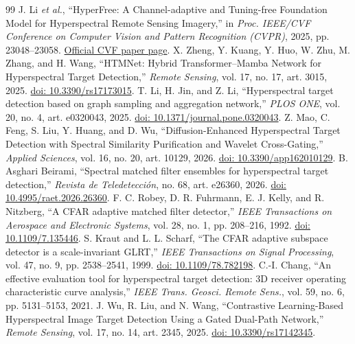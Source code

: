 \documentclass[a4paper,11pt]{article}
\begin{document}
\begin{thebibliography}{99}
 J. Li \emph{et al.}, ``HyperFree: A Channel-adaptive and Tuning-free Foundation Model for Hyperspectral Remote Sensing Imagery,'' in \emph{Proc. IEEE/CVF Conference on Computer Vision and Pattern Recognition (CVPR)}, 2025, pp. 23048--23058. \href{https://openaccess.thecvf.com/content/CVPR2025/html/Li_HyperFree_A_Channel-adaptive_and_Tuning-free_Foundation_Model_for_Hyperspectral_Remote_CVPR_2025_paper.html}{Official CVF paper page}.
 X. Zheng, Y. Kuang, Y. Huo, W. Zhu, M. Zhang, and H. Wang, ``HTMNet: Hybrid Transformer--Mamba Network for Hyperspectral Target Detection,'' \emph{Remote Sensing}, vol. 17, no. 17, art. 3015, 2025. \href{https://doi.org/10.3390/rs17173015}{doi: 10.3390/rs17173015}.
 T. Li, H. Jin, and Z. Li, ``Hyperspectral target detection based on graph sampling and aggregation network,'' \emph{PLOS ONE}, vol. 20, no. 4, art. e0320043, 2025. \href{https://doi.org/10.1371/journal.pone.0320043}{doi: 10.1371/journal.pone.0320043}.
 Z. Mao, C. Feng, S. Liu, Y. Huang, and D. Wu, ``Diffusion-Enhanced Hyperspectral Target Detection with Spectral Similarity Purification and Wavelet Cross-Gating,'' \emph{Applied Sciences}, vol. 16, no. 20, art. 10129, 2026. \href{https://doi.org/10.3390/app162010129}{doi: 10.3390/app162010129}.
 B. Asghari Beirami, ``Spectral matched filter ensembles for hyperspectral target detection,'' \emph{Revista de Teledetecci\'on}, no. 68, art. e26360, 2026. \href{https://doi.org/10.4995/raet.2026.26360}{doi: 10.4995/raet.2026.26360}.
 F. C. Robey, D. R. Fuhrmann, E. J. Kelly, and R. Nitzberg, ``A CFAR adaptive matched filter detector,'' \emph{IEEE Transactions on Aerospace and Electronic Systems}, vol. 28, no. 1, pp. 208--216, 1992. \href{https://doi.org/10.1109/7.135446}{doi: 10.1109/7.135446}.
 S. Kraut and L. L. Scharf, ``The CFAR adaptive subspace detector is a scale-invariant GLRT,'' \emph{IEEE Transactions on Signal Processing}, vol. 47, no. 9, pp. 2538--2541, 1999. \href{https://doi.org/10.1109/78.782198}{doi: 10.1109/78.782198}.
 C.-I. Chang, ``An effective evaluation tool for hyperspectral target detection: 3D receiver operating characteristic curve analysis,'' \emph{IEEE Trans. Geosci. Remote Sens.}, vol. 59, no. 6, pp. 5131--5153, 2021.
 J. Wu, R. Liu, and N. Wang, ``Contrastive Learning-Based Hyperspectral Image Target Detection Using a Gated Dual-Path Network,'' \emph{Remote Sensing}, vol. 17, no. 14, art. 2345, 2025. \href{https://doi.org/10.3390/rs17142345}{doi: 10.3390/rs17142345}.

\end{thebibliography}
\end{document}
